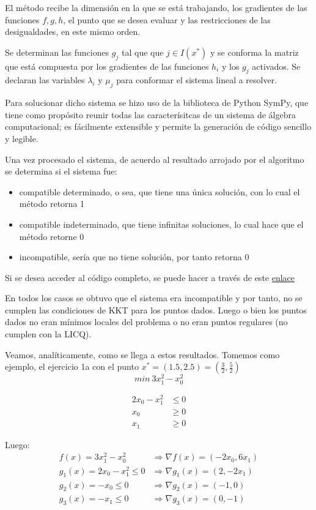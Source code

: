 \documentclass[titlepage, 11pt]{scrartcl}
\begin{document}
El método recibe la dimensión en la que se está trabajando, los gradientes de las funciones $f, g, h$, el punto que se desea evaluar y las restricciones de las desigualdades, en este mismo orden.

Se determinan las funciones $g_j$ tal que que $j\in I(x^*)$ y se conforma la matriz que está compuesta por los gradientes de las funciones $h_i$ y los $g_j$ activados. Se declaran las variables $\lambda_i$ y $\mu_j$ para conformar el sistema lineal a resolver.

Para solucionar dicho sistema se hizo uso de la biblioteca de Python SymPy, que tiene como propósito reunir todas las caracterísitcas de un sistema de álgebra computacional; es fácilmente extensible y permite la generación de código sencillo y legible.

Una vez procesado el sistema, de acuerdo al resultado arrojado por el algoritmo se determina si el sistema fue:
\begin{itemize}
	\item  compatible determinado, o sea, que tiene una única solución, con lo cual el método retorna 1
	\item compatible indeterminado, que tiene infinitas soluciones, lo cual hace que el método retorne 0
	\item incompatible, sería que no tiene solución, por tanto retorna 0
\end{itemize}

Si se desea acceder al código completo, se puede hacer a través de este \href{utils.py}{enlace}
	
En todos los casos se obtuvo que el sistema era incompatible y por tanto, no se cumplen las condiciones de KKT para los puntos dados. Luego o bien los puntos dados no eran m\'inimos locales del problema o no eran puntos regulares (no cumplen con la LICQ).

Veamos, analíticamente, como se llega a estos resultados. Tomemos como ejemplo, el ejercicio 1a con el punto $x^* = (1.5, 2.5) = (\frac{3}{2}, \frac{5}{2})$
\begin{equation*}
		min \ 3x_1^2 - x_0^2
\end{equation*}

\begin{align*}
	2x_0 - x_1^2 &\leq 0\\
	x_0 &\geq 0\\
	x_1 &\geq 0
\end{align*}

Luego:
\begin{align*}
	f(x) = 3x_1^2 - x_0^2 &\Rightarrow \nabla f(x) = (-2x_0, 6x_1)\\
	g_1(x) = 2x_0 - x_1^2 \leq 0 &\Rightarrow \nabla g_1(x) = (2, -2x_1)\\
	g_2(x) = -x_0 \leq 0 &\Rightarrow \nabla g_2(x) = (-1, 0)\\
	g_3(x) =  -x_1 \leq 0 &\Rightarrow \nabla g_3(x) = (0, -1)
\end{align*}
\end{document}
